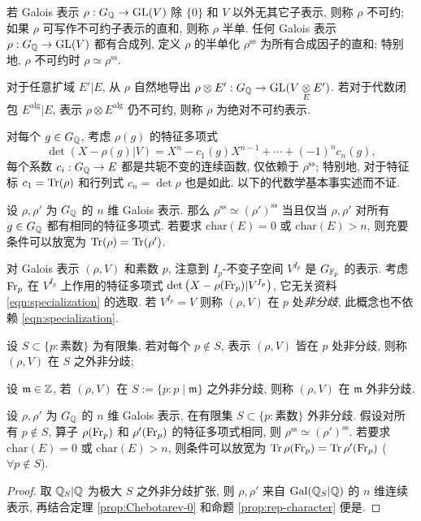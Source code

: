 \begin{definition}
	若 Galois 表示 $\rho: G_{\mathbb{Q}} \to \operatorname{GL}(V)$ 除 $\{0\}$ 和 $V$ 以外无其它子表示, 则称 $\rho$ 不可约; 如果 $\rho$ 可写作不可约子表示的直和, 则称 $\rho$ 半单. 任何 Galois 表示 $\rho: G_{\mathbb{Q}} \to \operatorname{GL}(V)$ 都有合成列, 定义 $\rho$ 的半单化 $\rho^{\mathrm{ss}}$ 为所有合成因子的直和; 特别地, $\rho$ 不可约时 $\rho \simeq \rho^{\mathrm{ss}}$.
	
	对于任意扩域 $E'|E$, 从 $\rho$ 自然地导出 $\rho \otimes E' : G_{\mathbb{Q}} \to \operatorname{GL}(V \underset{E}{\otimes} E')$. 若对于代数闭包 $E^{\mathrm{alg}} | E$, 表示 $\rho \otimes E^{\mathrm{alg}}$ 仍不可约, 则称 $\rho$ 为绝对不可约表示.
\end{definition}

对每个 $g \in G_{\mathbb{Q}}$, 考虑 $\rho(g)$ 的特征多项式
\[ \det(X - \rho(g) | V) = X^n - c_1(g) X^{n-1} + \cdots + (-1)^n c_n(g), \]
每个系数 $c_i: G_{\mathbb{Q}} \to E$ 都是共轭不变的连续函数, 仅依赖于 $\rho^{\mathrm{ss}}$; 特别地, 对于特征标 $c_1 = \operatorname{Tr}(\rho)$ 和行列式 $c_n = \det\rho$ 也是如此. 以下的代数学基本事实述而不证.

\begin{proposition}\label{prop:rep-character}
	设 $\rho, \rho'$ 为 $G_{\mathbb{Q}}$ 的 $n$ 维 Galois 表示. 那么 $\rho^{\mathrm{ss}} \simeq (\rho')^{\mathrm{ss}}$ 当且仅当 $\rho, \rho'$ 对所有 $g \in G_{\mathbb{Q}}$ 都有相同的特征多项式. 若要求 $\mathrm{char}(E) = 0$ 或 $\mathrm{char}(E) > n$, 则充要条件可以放宽为 $\operatorname{Tr}(\rho) = \operatorname{Tr}(\rho')$.
\end{proposition}

对 Galois 表示 $(\rho, V)$ 和素数 $p$, 注意到 $I_p$-不变子空间 $V^{I_p}$ 是 $G_{\mathbb{F}_p}$ 的表示. 考虑 $\operatorname{Fr}_p$ 在 $V^{I_p}$ 上作用的特征多项式 $\det\left( X - \rho(\operatorname{Fr}_p) | V^{I_p} \right)$, 它无关资料 \eqref{eqn:specialization} 的选取. 若 $V^{I_p} = V$ 则称 $(\rho, V)$ 在 $p$ 处\emph{非分歧}, 此概念也不依赖 \eqref{eqn:specialization}.
\begin{compactitem}
	\item 设 $S \subset \{p: \text{素数}\}$ 为有限集, 若对每个 $p \notin S$, 表示 $(\rho, V)$ 皆在 $p$ 处非分歧, 则称 $(\rho, V)$ 在 $S$ 之外非分歧;
	\item 设 $\mathfrak{m} \in \mathbb{Z}$, 若 $(\rho, V)$ 在 $S := \{p: p \mid \mathfrak{m} \}$ 之外非分歧, 则称 $(\rho, V)$ 在 $\mathfrak{m}$ 外非分歧.
\end{compactitem}

\begin{theorem}\label{prop:Chebotarev}
	设 $\rho, \rho'$ 为 $G_{\mathbb{Q}}$ 的 $n$ 维 Galois 表示, 在有限集 $S \subset \{p: \text{素数}\}$ 外非分歧. 假设对所有 $p \notin S$, 算子 $\rho(\operatorname{Fr}_p)$ 和 $\rho'(\operatorname{Fr}_p)$ 的特征多项式相同, 则 $\rho^{\mathrm{ss}} \simeq (\rho')^{\mathrm{ss}}$. 若要求 $\mathrm{char}(E) = 0$ 或 $\mathrm{char}(E) > n$, 则条件可以放宽为 $\operatorname{Tr}\rho(\operatorname{Fr}_p) = \operatorname{Tr}\rho'(\operatorname{Fr}_p)$ ($\forall p \notin S$).
\end{theorem}
\begin{proof}
	取 $\mathbb{Q}_S|\mathbb{Q}$ 为极大 $S$ 之外非分歧扩张, 则 $\rho, \rho'$ 来自 $\operatorname{Gal}(\mathbb{Q}_S|\mathbb{Q})$ 的 $n$ 维连续表示, 再结合定理 \ref{prop:Chebotarev-0} 和命题 \ref{prop:rep-character} 便是.
\end{proof}

